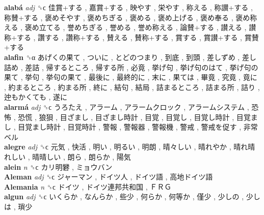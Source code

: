 \textbf{alabá} \emph{adj}  ␝ϲ   佳賞+する ,  嘉賞+する ,  映やす ,  栄やす ,  称える ,  称讃+する ,  称賛+する ,  褒めそやす ,  褒めちぎる ,  褒める ,  褒め上げる ,  褒め奉る ,  褒め称える ,  褒め立てる ,  誉めちぎる ,  誉める ,  誉め称える ,  論賛+する ,  讃える ,  讃称+する ,  讚する ,  讚称+する ,  賛える ,  賛称+する ,  賞する ,  賞讃+する ,  賞賛+する   \\
\textbf{alafin} ␝α   あげくの果て ,  ついに ,  とどのつまり ,  到底 ,  到頭 ,  差しずめ ,  差し詰め ,  差詰 ,  帰するところ ,  帰する所 ,  必竟 ,  挙げ句 ,  挙げ句のはて ,  挙げ句の果て ,  挙句 ,  挙句の果て ,  最後に ,  最終的に ,  末に ,  果ては ,  畢竟 ,  究竟 ,  竟に ,  約まるところ ,  約まる所 ,  終に ,  結句 ,  結局 ,  詰まるところ ,  詰まる所 ,  詰り ,  迚もかくても ,  遂に   \\
\textbf{alarmá} \emph{adj}  ␝ϲ   うろたえ ,  アラーム ,  アラームクロック ,  アラームシステム ,  恐怖 ,  恐慌 ,  狼狽 ,  目ざまし ,  目ざまし時計 ,  目覚 ,  目覚し ,  目覚し時計 ,  目覚まし ,  目覚まし時計 ,  目覚時計 ,  警報 ,  警報器 ,  警報機 ,  警戒 ,  警戒を促す ,  非常ベル   \\
\textbf{alegre} \emph{adj}  ␝ϲ   元気 ,  快活 ,  明い ,  明るい ,  明朗 ,  晴々しい ,  晴れやか ,  晴れ晴れしい ,  晴晴しい ,  朗ら ,  朗らか ,  陽気   \\
\textbf{alein} \emph{n}  ␝ϲ   カリ明礬 ,  ミョウバン   \\
\textbf{Aleman} \emph{adj}  ␝ϲ   ジャーマン ,  ドイツ人 ,  ドイツ語 ,  高地ドイツ語   \\
\textbf{Alemania} \emph{n}  ␝ϲ   ドイツ ,  ドイツ連邦共和国 ,  ＦＲＧ   \\
\textbf{algun} \emph{adj}  ␝ϲ   いくらか ,  なんらか ,  些少 ,  何らか ,  何等か ,  僅少 ,  少しの ,  少しは ,  瑣少   \\
